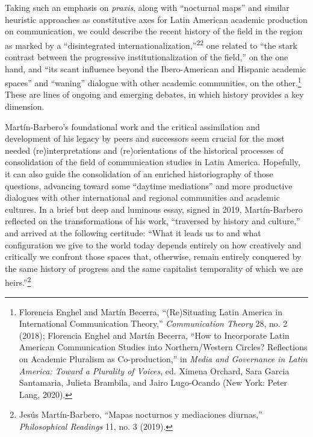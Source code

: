 \documentclass{tufte-handout}
\begin{document}
Taking such an emphasis on \emph{praxis}, along with ``nocturnal maps''
and similar heuristic approaches as constitutive axes for Latin American
academic production on communication, we could describe the recent
history of the field in the region as marked by a ``disintegrated
internationalization,''\textsuperscript{22} one
related to ``the stark contrast between the progressive
institutionalization\setcounter{footnote}{22} of the field,'' on the one hand, and ``its scant
influence beyond the Ibero-American and Hispanic academic spaces'' and
``waning'' dialogue with other academic communities, on the
other.\footnote{Florencia Enghel and Martín Becerra, ``(Re)Situating Latin America in
  International Communication Theory,'' \emph{Communication Theory} 28,
  no. 2 (2018); Florencia Enghel and Martín Becerra, ``How to
  Incorporate Latin American Communication Studies into Northern/Western
  Circles? Reflections on Academic Pluralism as Co-production,'' in
  \emph{Media and Governance in Latin America: Toward a Plurality of
  Voices}, ed. Ximena Orchard, Sara Garcia Santamaria, Julieta Brambila,
  and Jairo Lugo-Ocando (New York: Peter Lang, 2020).
} These are lines of ongoing
and emerging debates, in which history provides a key dimension.

Martín-Barbero's foundational work and the critical assimilation and
development of his legacy by peers and successors seem crucial for the
most needed (re)interpretations and (re)orientations of the historical
processes of consolidation of the field of communication studies in
Latin America. Hopefully, it can also guide the consolidation of an
enriched historiography of those questions, advancing toward some
``daytime mediations'' and more productive dialogues with other
international and regional communities and academic cultures. In a brief
but deep and luminous essay, signed in 2019, Martín-Barbero reflected on
the transformations of his work, ``traversed by history and culture,''
and arrived at the following certitude: ``What it leads us to and what
configuration we give to the world today depends entirely on how
creatively and critically we confront those spaces that, otherwise,
remain entirely conquered by the same history of progress and the same
capitalist temporality of which we are
heirs.''\footnote{ Jesús Martín-Barbero, ``Mapas nocturnos y mediaciones diurnas,''
  \emph{Philosophical Readings} 11, no. 3 (2019).}
\end{document}
